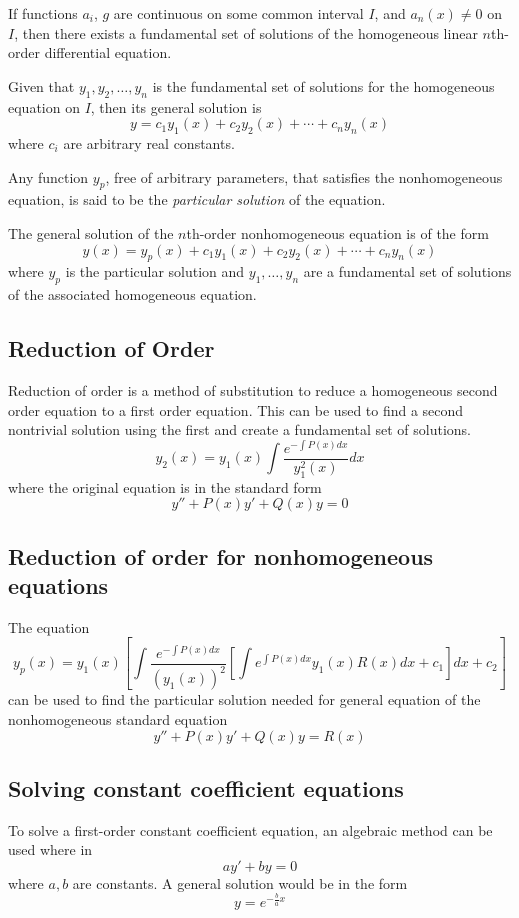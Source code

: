 \begin{theorem}
    If functions $a_i$, $g$ are continuous on some common interval $I$, and $a_n(x) \ne 0$ on $I$, then there exists a fundamental set of solutions of the homogeneous linear $n$th-order differential equation.
\end{theorem}

Given that $y_1, y_2, \ldots, y_n$ is the fundamental set of solutions for the homogeneous equation on $I$, then its general solution is
\[
    y = c_1 y_1(x) + c_2 y_2(x) + \cdots + c_n y_n(x)
\]
where $c_i$ are arbitrary real constants.

Any function $y_p$, free of arbitrary parameters, that satisfies the nonhomogeneous equation, is said to be the \textit{particular solution} of the equation.

\begin{theorem}
    The general solution of the $n$th-order nonhomogeneous equation is of the form
    \[
        y(x) = y_p(x) + c_1 y_1(x) + c_2 y_2(x) + \cdots + c_n y_n(x)
    \]
    where $y_p$ is the particular solution and $y_1, \ldots, y_n$ are a fundamental set of solutions of the associated homogeneous equation.
\end{theorem}

\subsection{Reduction of Order}

Reduction of order is a method of substitution to reduce a homogeneous second order equation to a first order equation. This can be used to find a second nontrivial solution using the first and create a fundamental set of solutions.
\[
    y_2(x) = y_1(x) \int \frac{e^{-\int P(x)dx}}{y_1^2(x)}dx
\]
where the original equation is in the standard form
\[
    y'' + P(x)y' + Q(x)y = 0
\]

\subsection{Reduction of order for nonhomogeneous equations}

The equation
\[
    y_p(x) = y_1(x) \left[ \int \frac{e^{-\int P(x)dx}}{(y_1(x))^2} \left[ \int e^{\int P(x)dx} y_1(x) R(x)dx + c_1 \right] dx + c_2 \right]
\]
can be used to find the particular solution needed for general equation of the nonhomogeneous standard equation
\[
    y'' + P(x)y' + Q(x)y = R(x)
\]

\subsection{Solving constant coefficient equations}

To solve a first-order constant coefficient equation, an algebraic method can be used where in
\[
    ay' + by = 0
\]
where $a,b$ are constants. A general solution would be in the form
\[
    y = e^{-\frac{b}{a}x}
\]